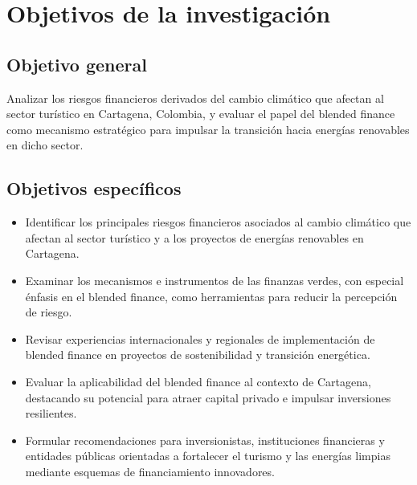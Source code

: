 \section{Objetivos de la investigación}

\subsection{Objetivo general}

Analizar los riesgos financieros derivados del cambio climático que afectan al sector turístico en Cartagena, Colombia, y evaluar el papel del blended finance como mecanismo estratégico para impulsar la transición hacia energías renovables en dicho sector. 

\subsection{Objetivos específicos}

\begin{itemize}
    \item Identificar los principales riesgos financieros asociados al cambio climático que afectan al sector turístico y a los proyectos de energías renovables en Cartagena.

    \item Examinar los mecanismos e instrumentos de las finanzas verdes, con especial énfasis en el blended finance, como herramientas para reducir la percepción de riesgo.
    
    \item Revisar experiencias internacionales y regionales de implementación de blended finance en proyectos de sostenibilidad y transición energética.
    
    \item Evaluar la aplicabilidad del blended finance al contexto de Cartagena, destacando su potencial para atraer capital privado e impulsar inversiones resilientes.
    
    \item Formular recomendaciones para inversionistas, instituciones financieras y entidades públicas orientadas a fortalecer el turismo y las energías limpias mediante esquemas de financiamiento innovadores.
\end{itemize}
